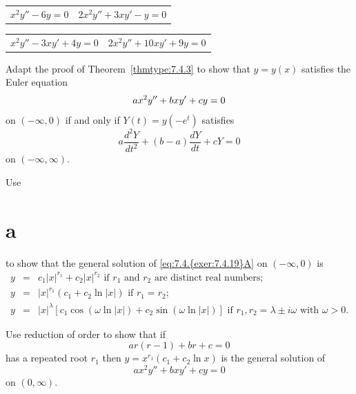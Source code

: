 \begin{exerciselist}
  \begin{tabular}[t]{@{}p{168pt}@{}p{168pt}}
    \item\label{exer:7.4.15} $x^{2}y''-6y=0$ &
    \item\label{exer:7.4.16} $2x^{2}y''+3xy'-y=0$
  \end{tabular}

  \begin{tabular}[t]{@{}p{168pt}@{}p{168pt}}
    \item\label{exer:7.4.17} $x^{2}y''-3xy'+4y=0$ &
    \item\label{exer:7.4.18} $2x^{2}y''+10xy'+9y=0$
  \end{tabular}

  \item\label{exer:7.4.19}
  \begin{alist}
    \item %
    Adapt the proof of Theorem~\ref{thmtype:7.4.3} to show that $y=y(x)$ satisfies the Euler
    equation
    \setcounter{equation}{0}
    \begin{equation}
      \label{eq:7.4.{exer:7.4.19}A}ax^{2}y''+bxy'+cy=0
    \end{equation}
    on $(-\infty,0)$ if and only if $Y(t)=y(-e^{t})$ satisfies
    \[
      a\frac{d^{2}Y}{dt^{2}}+(b-a)\frac{dY}{dt}+cY=0
    \]
    on $(-\infty,\infty)$.

    \item %
    Use \part{a} to show that the general solution of \eqref{eq:7.4.{exer:7.4.19}A} on $(-\infty,0)$
    is
    \begin{eqnarray*}
      y & = & c_{1}|x|^{r_{1}}+c_{2}|x|^{r_{2}}\mbox{ if $r_{1}$ and $r_{2}$ are distinct real numbers; } \\
      y & = & |x|^{r_{1}}(c_{1}+c_{2}\ln|x|)\mbox{ if $r_{1}=r_{2}$; }                                    \\
      y & = & |x|^{\lambda}\left[c_{1}\cos\left(\omega\ln|x|\right)+c_{2}\sin\left(\omega\ln|x|\right)\right]\mbox{ if $r_{1},r_{2}=\lambda\pm i\omega$ with $\omega>0$}.
    \end{eqnarray*}
  \end{alist}

  \item\label{exer:7.4.20} Use reduction of order to show that if
  \[
    ar(r-1)+br+c=0
  \]
  has a repeated root $r_{1}$ then $y=x^{r_{1}}(c_{1}+c_{2}\ln x)$ is the general solution of
  \[
    ax^{2}y''+bxy'+cy=0
  \]
  on $(0,\infty)$.


\end{exerciselist}
